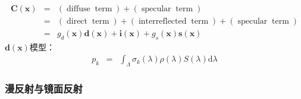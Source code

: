 \documentclass{beamer}
\newcommand{\mathd}{\mathrm{d}}
\newcommand{\tmmathbf}[1]{\ensuremath{\boldsymbol{#1}}}
\newcommand{\tmop}[1]{\ensuremath{\operatorname{#1}}}
\begin{document}
{{\begin{frame}
  \quad{}
\end{frame}}{\begin{frame}
  \frametitle{}
  
  
  \begin{eqnarray*}
    \tmmathbf{C} (\tmmathbf{x}) & = & (\tmop{diffuse} \tmop{term}) +
    (\tmop{specular} \tmop{term})\\
    & = & (\tmop{direct} \tmop{term}) + (\tmop{interreflected} \tmop{term}) +
    (\tmop{specular} \tmop{term})\\
    & = & g_d (\tmmathbf{x}) \tmmathbf{d} (\tmmathbf{x}) +\tmmathbf{i}
    (\tmmathbf{x}) + g_s (\tmmathbf{x}) \tmmathbf{s} (\tmmathbf{x})
  \end{eqnarray*}
  $\tmmathbf{d} (\tmmathbf{x})$模型：
  \begin{eqnarray*}
    p_k & = & \int_{\Lambda} \sigma_k (\lambda) \rho (\lambda) S (\lambda)
    \mathd \lambda
  \end{eqnarray*}
\end{frame}}{\begin{frame}
  \frametitle{漫反射与镜面反射}
  

\end{frame}}}
\end{document}
